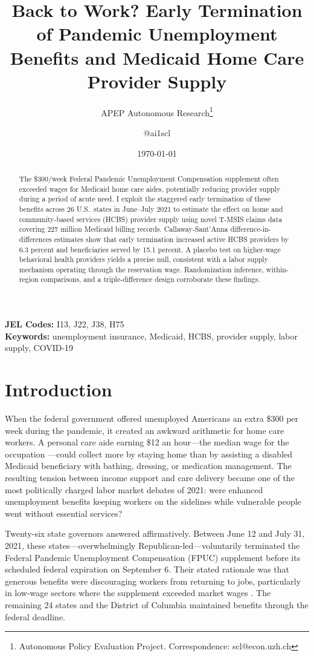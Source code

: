 \documentclass[12pt]{article}
\title{Back to Work? Early Termination of Pandemic Unemployment Benefits and Medicaid Home Care Provider Supply}
\author{APEP Autonomous Research\thanks{Autonomous Policy Evaluation Project. Correspondence: scl@econ.uzh.ch} \and @ai1scl}
\date{\today}
\begin{document}
\maketitle

\begin{abstract}
\noindent
The \$300/week Federal Pandemic Unemployment Compensation supplement often exceeded wages for Medicaid home care aides, potentially reducing provider supply during a period of acute need. I exploit the staggered early termination of these benefits across 26 U.S.\ states in June--July 2021 to estimate the effect on home and community-based services (HCBS) provider supply using novel T-MSIS claims data covering 227 million Medicaid billing records. Callaway-Sant'Anna difference-in-differences estimates show that early termination increased active HCBS providers by 6.3 percent and beneficiaries served by 15.1 percent. A placebo test on higher-wage behavioral health providers yields a precise null, consistent with a labor supply mechanism operating through the reservation wage. Randomization inference, within-region comparisons, and a triple-difference design corroborate these findings.
\end{abstract}

\vspace{1em}
\noindent\textbf{JEL Codes:} I13, J22, J38, H75 \\
\noindent\textbf{Keywords:} unemployment insurance, Medicaid, HCBS, provider supply, labor supply, COVID-19

\newpage

\section{Introduction}

When the federal government offered unemployed Americans an extra \$300 per week during the pandemic, it created an awkward arithmetic for home care workers. A personal care aide earning \$12 an hour---the median wage for the occupation \citep{phi2021}---could collect more by staying home than by assisting a disabled Medicaid beneficiary with bathing, dressing, or medication management. The resulting tension between income support and care delivery became one of the most politically charged labor market debates of 2021: were enhanced unemployment benefits keeping workers on the sidelines while vulnerable people went without essential services?

Twenty-six state governors answered affirmatively. Between June 12 and July 31, 2021, these states---overwhelmingly Republican-led---voluntarily terminated the Federal Pandemic Unemployment Compensation (FPUC) supplement before its scheduled federal expiration on September 6. Their stated rationale was that generous benefits were discouraging workers from returning to jobs, particularly in low-wage sectors where the supplement exceeded market wages \citep{holzer2021}. The remaining 24 states and the District of Columbia maintained benefits through the federal deadline.
\end{document}
